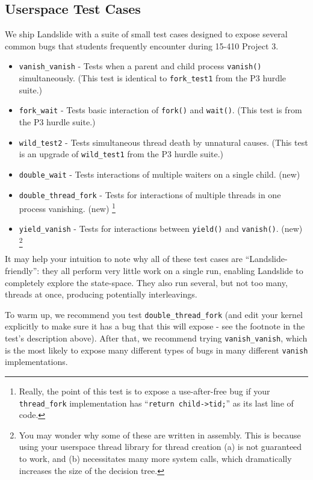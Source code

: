 \documentclass{article}
\begin{document}
\subsection{Userspace Test Cases}
\label{sec:testcase}

We ship Landslide with a suite of small test cases designed to expose several common bugs that students frequently encounter during 15-410 Project 3.

\begin{itemize}
	\item \texttt{vanish\_vanish} - Tests when a parent and child process \texttt{vanish()} simultaneously. (This test is identical to \texttt{fork\_test1} from the P3 hurdle suite.)
	\item \texttt{fork\_wait} - Tests basic interaction of \texttt{fork()} and \texttt{wait()}. (This test is from the P3 hurdle suite.)
	\item \texttt{wild\_test2} - Tests simultaneous thread death by unnatural causes. (This test is an upgrade of \texttt{wild\_test1} from the P3 hurdle suite.)
	\item \texttt{double\_wait} - Tests interactions of multiple waiters on a single child. (new)
	\item \texttt{double\_thread\_fork} - Tests for interactions of multiple threads in one process vanishing. (new)
		\footnote{Really, the point of this test is to expose a use-after-free bug if your \texttt{thread\_fork} implementation has ``\texttt{return child->tid;}'' as its last line of code.}
	\item \texttt{yield\_vanish} - Tests for interactions between \texttt{yield()} and \texttt{vanish()}. (new)
		\footnote{You may wonder why some of these are written in assembly. This is because using your userspace thread library for thread creation (a) is not guaranteed to work, and (b) necessitates many more system calls, which dramatically increases the size of the decision tree.}
\end{itemize}

It may help your intuition to note why all of these test cases are ``Landslide-friendly'': they all perform very little work on a single run, enabling Landslide to completely explore the state-space. They also run several, but not too many, threads at once, producing potentially interleavings.

To warm up, we recommend you test \texttt{double\_thread\_fork} (and edit your kernel explicitly to make sure it has a bug that this will expose - see the footnote in the test's description above).
After that, we recommend trying \texttt{vanish\_vanish}, which is the most likely to expose many different types of bugs in many different \texttt{vanish} implementations.
\end{document}

